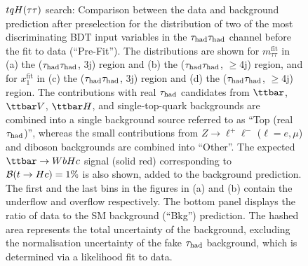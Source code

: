 \begin{figure}[t]
\begin{center}
\caption{$tqH(\tau\tau)$ search: Comparison between the data and background prediction after preselection for the distribution of two of the most 
discriminating BDT input variables in the $\tau_{\mathrm{had}} \tau_{\mathrm{had}}$ channel before the fit to data (``Pre-Fit''). The distributions are shown for
$m_{\tau\tau}^{\text{fit}}$ in (a) the ($\tau_{\mathrm{had}} \tau_{\mathrm{had}}$, 3j) region and (b) the ($\tau_{\mathrm{had}} \tau_{\mathrm{had}}$, $\geq$4j) region, and for
$x_{1}^{\text{fit}}$ in (c) the ($\tau_{\mathrm{had}} \tau_{\mathrm{had}}$, 3j)  region and (d) the ($\tau_{\mathrm{had}} \tau_{\mathrm{had}}$, $\geq$4j) region.
The contributions with real $\tau_{\mathrm{had}}$ candidates from $\ttbar$,  $\ttbar V$, $\ttbar H$, and single-top-quark backgrounds are combined into
a single background source referred to as ``Top (real $\tau_{\mathrm{had}}$)'', whereas the small contributions from 
$Z\to \ell^+\ell^-$ ($\ell = e, \mu$) and diboson backgrounds are combined into ``Other''. 
The expected $\Hc$ signal (solid red) corresponding to $\mathcal{B}(t\to Hc)=1\%$ is also shown,
added to the background prediction.
The first and the last bins in the figures in (a) and (b) contain the underflow and overflow respectively.
The bottom panel displays the ratio of data to the SM background (``Bkg'') prediction.
The hashed area represents the total uncertainty of the background, excluding the normalisation uncertainty of the fake $\tau_{\mathrm{had}}$ background, 
which is determined via a likelihood fit to data.} 
\label{fig:BDT_inputs_hadhad}
\end{center}
\end{figure}

